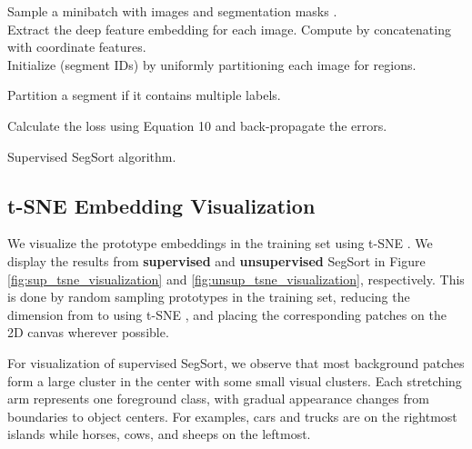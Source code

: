 \documentclass[10pt,twocolumn,letterpaper]{article}
\begin{document}
\begin{algorithm}[b]
\label{alg}
\SetAlgoLined
\SetNoFillComment
{} {
    Sample a minibatch with  images  and segmentation masks . \\
    Extract the deep feature embedding  for each image.
    Compute  by concatenating  with coordinate features. \\
    Initialize  (segment IDs) by uniformly partitioning each image for  regions.
    
     {
    
    
    }
    
    Partition a segment if it contains multiple labels.
    
    
    Calculate the loss using Equation 10 and back-propagate the errors.
    }
\caption{Supervised SegSort algorithm.}
\end{algorithm}




\subsection{t-SNE Embedding Visualization}
\label{sec:tsne}

We visualize the prototype embeddings in the training set using t-SNE \cite{maaten2008visualizing}. We display the results from {\bf supervised} and {\bf unsupervised} SegSort in Figure \ref{fig:sup_tsne_visualization} and \ref{fig:unsup_tsne_visualization}, respectively. This is done by random sampling  prototypes in the training set, reducing the dimension from  to  using t-SNE \cite{maaten2008visualizing}, and placing the corresponding patches on the 2D canvas wherever possible. 

For visualization of supervised SegSort, we observe that most background patches form a large cluster in the center with some small visual clusters. Each stretching arm represents one foreground class, with gradual appearance changes from boundaries to object centers. For examples, cars and trucks are on the rightmost islands while horses, cows, and sheeps on the leftmost.
\end{document}
